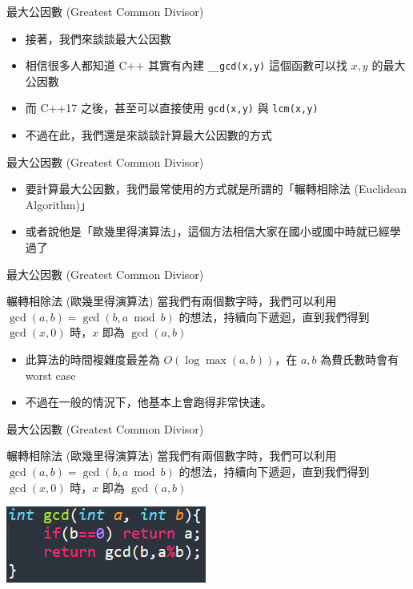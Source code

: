 \documentclass[aspectratio=169]{beamer}
\begin{document}
\begin{frame}{最大公因數 (Greatest Common Divisor)}
     \begin{itemize}
         \item<1-> 接著，我們來談談最大公因數
         \item<2-> 相信很多人都知道 C++ 其實有內建 \texttt{\_\_gcd(x,y)} 這個函數可以找 $x,y$ 的最大公因數
         \item<2-> 而 C++17 之後，甚至可以直接使用 \texttt{gcd(x,y)} 與 \texttt{lcm(x,y)}
         \item<3-> 不過在此，我們還是來談談計算最大公因數的方式
     \end{itemize}
\end{frame}

\begin{frame}{最大公因數 (Greatest Common Divisor)}
     \begin{itemize}
         \item<1-> 要計算最大公因數，我們最常使用的方式就是所謂的「輾轉相除法 (Euclidean Algorithm)」
         \item<1-> 或者說他是「歐幾里得演算法」，這個方法相信大家在國小或國中時就已經學過了
     \end{itemize}
\end{frame}

\begin{frame}{最大公因數 (Greatest Common Divisor)}
    \begin{alertblock}{輾轉相除法 (歐幾里得演算法)}
        當我們有兩個數字時，我們可以利用 $\gcd(a,b) = \gcd(b,a \bmod b)$ 的想法，持續向下遞迴，直到我們得到 $\gcd(x,0)$ 時，$x$ 即為 $\gcd(a,b)$
    \end{alertblock} 
    \begin{itemize}
        \item 此算法的時間複雜度最差為 $O(\log \max(a,b))$，在 $a,b$ 為費氏數時會有 worst case
        \item 不過在一般的情況下，他基本上會跑得非常快速。
    \end{itemize}
\end{frame}

\begin{frame}{最大公因數 (Greatest Common Divisor)}
    \begin{alertblock}{輾轉相除法 (歐幾里得演算法)}
        當我們有兩個數字時，我們可以利用 $\gcd(a,b) = \gcd(b,a \bmod b)$ 的想法，持續向下遞迴，直到我們得到 $\gcd(x,0)$ 時，$x$ 即為 $\gcd(a,b)$
    \end{alertblock} 
    \begin{center}
        \includegraphics[]{images/code6.png}
    \end{center}
\end{frame}
\end{document}
